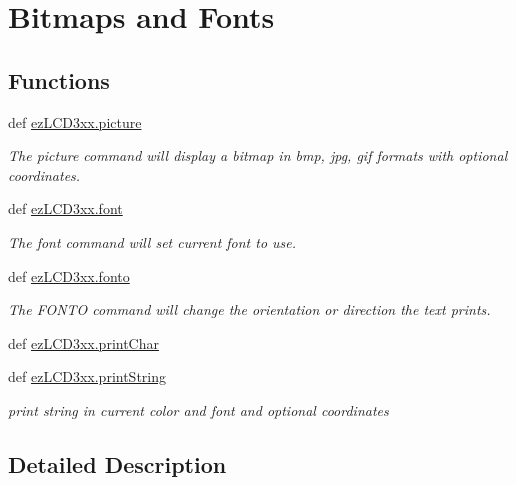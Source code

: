 \hypertarget{group___bitmap_font}{\section{Bitmaps and Fonts}
\label{group___bitmap_font}
}
\subsection*{Functions}
\begin{DoxyCompactItemize}
\item 
def \hyperlink{group___bitmap_font_ga3bdde0a3f8505adbfb3c4b7107da7650}{ez\-L\-C\-D3xx.\-picture}
\begin{DoxyCompactList}\small\item\em The picture command will display a bitmap in bmp, jpg, gif formats with optional coordinates. \end{DoxyCompactList}\item 
def \hyperlink{group___bitmap_font_ga7099c8ffc9b76ad3213d241bb8b8070f}{ez\-L\-C\-D3xx.\-font}
\begin{DoxyCompactList}\small\item\em The font command will set current font to use. \end{DoxyCompactList}\item 
def \hyperlink{group___bitmap_font_ga445e7a916dbdae456f88bea5fcd88745}{ez\-L\-C\-D3xx.\-fonto}
\begin{DoxyCompactList}\small\item\em The F\-O\-N\-T\-O command will change the orientation or direction the text prints. \end{DoxyCompactList}\item 
def \hyperlink{group___bitmap_font_gafe8f092541df1ab4d72798e5f3b4e66d}{ez\-L\-C\-D3xx.\-print\-Char}
\item 
def \hyperlink{group___bitmap_font_gac3a90d479a0423de66988b9850f4852c}{ez\-L\-C\-D3xx.\-print\-String}
\begin{DoxyCompactList}\small\item\em print string in current color and font and optional coordinates \end{DoxyCompactList}\end{DoxyCompactItemize}


\subsection{Detailed Description}


